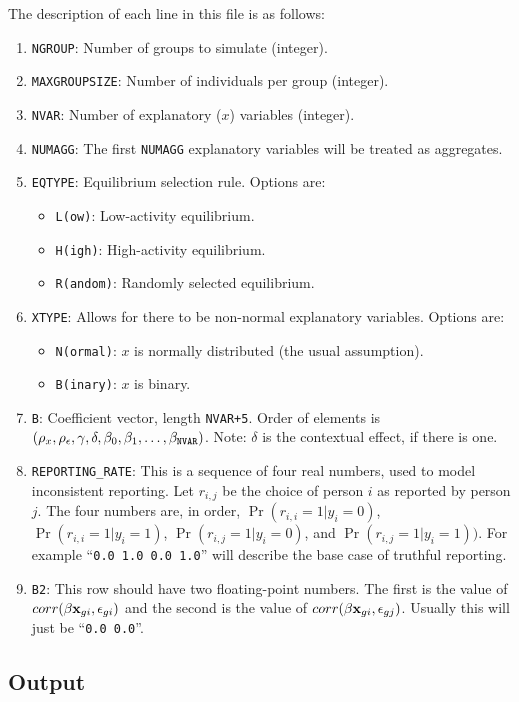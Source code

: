 \documentclass{article}
\begin{document}
The description of each line in this file is as follows:
\begin{enumerate}
\item {\tt NGROUP}: Number of groups to simulate (integer).
\item {\tt MAXGROUPSIZE}: Number of individuals per group (integer).
\item {\tt NVAR}: Number of explanatory ($x$) variables (integer).
\item {\tt NUMAGG}: The first {\tt NUMAGG} explanatory variables will be
	treated as aggregates.
\item {\tt EQTYPE}: Equilibrium selection rule.  Options are:
	\begin{itemize}
		\item {\tt L(ow)}: Low-activity equilibrium.
		\item {\tt H(igh)}: High-activity equilibrium.
		\item {\tt R(andom)}: Randomly selected equilibrium.
	\end{itemize}
\item {\tt XTYPE}: Allows for there to be non-normal explanatory variables.  Options are:
	\begin{itemize}
		\item {\tt N(ormal)}: $x$ is normally distributed (the usual assumption).
		\item {\tt B(inary)}: $x$ is binary.  
	\end{itemize}
\item {\tt B}: Coefficient vector, length {\tt NVAR+5}.  Order of elements is
	$(\rho_x,\rho_{\epsilon},\gamma,\delta,\beta_0,\beta_1,\ldots,\beta_{\tt NVAR})$.
	Note: $\delta$ is the contextual effect, if there is one.
\item {\tt REPORTING\_RATE}: This is a sequence of four real numbers,
	used to model inconsistent reporting.  Let $r_{i,j}$ be the choice of 
	person $i$ as reported by person $j$. The four numbers are, in order, 
	$\Pr(r_{i,i}=1|y_i=0)$, $\Pr(r_{i,i}=1|y_i=1)$, $\Pr(r_{i,j}=1|y_i=0)$,
	and $\Pr(r_{i,j}=1|y_i=1))$.
	For example ``{\tt 0.0 1.0 0.0 1.0}'' will describe the base case of
	truthful reporting.
\item {\tt B2}: This row should have two floating-point numbers.  The first is the 
	value of $corr(\beta {\bf x}_{gi},\epsilon_{gi})$ and the second is the 
	value of $corr(\beta {\bf x}_{gi},\epsilon_{gj})$.  Usually this will just be 
	``{\tt 0.0 0.0}''.
\end{enumerate}

\subsection{Output}
\end{document}
